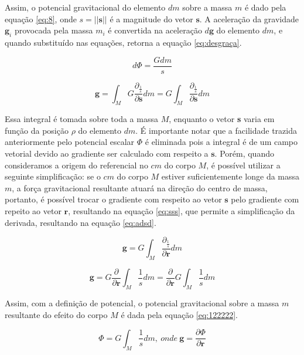 Assim, o potencial gravitacional do elemento $dm$ sobre a massa $m$ é dado pela equação \ref{eq:8}, onde $s = \left|\left| \textbf{s} \right|\right|$ é a magnitude do vetor $\textbf{s}$. A aceleração da gravidade $\textbf{g}_{i}$ provocada pela massa $m_{i}$ é convertida na aceleração $d\textbf{g}$ do elemento $dm$, e quando substituído nas equações, retorna a equação \ref{eq:desgraça}.

\begin{equation}
    d\Phi =  \frac{Gdm}{s}
\label{eq:8}
\end{equation}

\begin{equation}
    \textbf{g} =  \int_{M} G\frac{\partial_{\frac{1}{s}}}{\partial \textbf{s}} dm = G \int_{M}\frac{\partial_{\frac{1}{s}}}{\partial \textbf{s}} dm
\label{eq:desgraça}
\end{equation}

Essa integral é tomada sobre toda a massa $M$, enquanto o vetor \textbf{s} varia em função da posição $\rho$ do elemento $dm$. É importante notar que a facilidade trazida anteriormente pelo potencial escalar $\Phi$ é eliminada pois a integral é de um campo vetorial devido ao gradiente ser calculado com respeito a $\textbf{s}$. Porém, quando consideramos a origem do referencial no $cm$ do corpo $M$, é possível utilizar a seguinte simplificação: se o $cm$ do corpo $M$ estiver suficientemente longe da massa $m$, a força gravitacional resultante atuará na direção do centro de massa, portanto, é possível trocar o gradiente com respeito ao vetor $\textbf{s}$ pelo gradiente com repeito ao vetor $\textbf{r}$, resultando na equação \ref{eq:sss}, que permite a simplificação da derivada, resultando na equação \ref{eq:adsd}.

\begin{equation}
    \textbf{g} = G \int_{M} \frac{\partial_{\frac{1}{s}}}{\partial \textbf{r}} dm
\label{eq:sss}
\end{equation}

\begin{equation}
    \textbf{g} = G \frac{\partial}{\partial \textbf{r}} \int_{M} \frac{1}{s}dm = \frac{\partial}{\partial \textbf{r}}G \int_{M} \frac{1}{s}dm
\label{eq:adsd}
\end{equation}

Assim, com a definição de potencial, o potencial gravitacional sobre a massa $m$ resultante do efeito do corpo $M$ é dada pela equação \ref{eq:122222}.

\begin{equation}
    \Phi = G \int_{M} \frac{1}{s}dm, \ onde \ \textbf{g} = \frac{\partial\Phi}{\partial \textbf{r}}
\label{eq:122222}
\end{equation}

